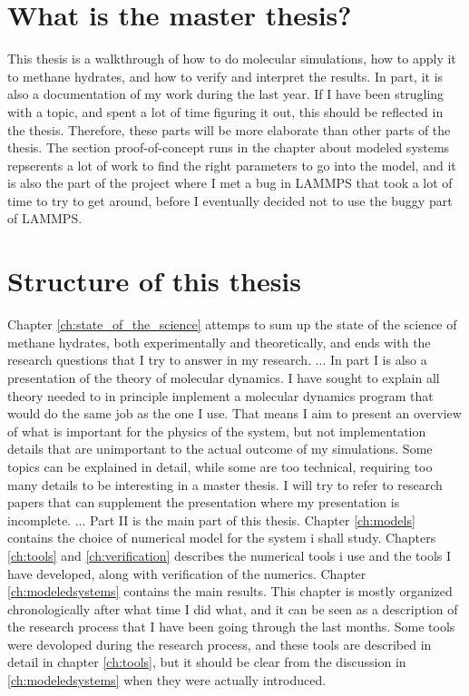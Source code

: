 \section{What is the master thesis?}
This thesis is a walkthrough of how to do molecular simulations, how to apply it to methane hydrates, and how to verify and interpret the results. In part, it is also a documentation of my work during the last year. If I have been strugling with a topic, and spent a lot of time figuring it out, this should be reflected in the thesis. Therefore, these parts will be more elaborate than other parts of the thesis. The section proof-of-concept runs in the chapter about modeled systems repserents a lot of work to find the right parameters to go into the model, and it is also the part of the project where I met a bug in LAMMPS that took a lot of time to try to get around, before I eventually decided not to use the buggy part of LAMMPS.


\section{Structure of this thesis}

Chapter \ref{ch:state_of_the_science} attemps to sum up the state of the science of methane hydrates, both experimentally and theoretically, and ends with the research questions that I try to answer in my research.
...
In part I is also a presentation of the theory of molecular dynamics. I have sought to explain all theory needed to in principle implement a molecular dynamics program that would do the same job as the one I use. That means I aim to present an overview of what is important for the physics of the system, but not implementation details that are unimportant to the actual outcome of my simulations. Some topics can be explained in detail, while some are too technical, requiring too many details to be interesting in a master thesis. I will try to refer to research papers that can supplement the presentation where my presentation is incomplete.
...
Part II is the main part of this thesis. Chapter \ref{ch:models} contains the choice of numerical model for the system i shall study. Chapters \ref{ch:tools} and \ref{ch:verification} describes the numerical tools i use and the tools I have developed, along with verification of the numerics. Chapter \ref{ch:modeledsystems} contains the main results. This chapter is mostly organized chronologically after what time I did what, and it can be seen as a description of the research process that I have been going through the last months. Some tools were devoloped during the research process, and these tools are described in detail in chapter \ref{ch:tools}, but it should be clear from the discussion in \ref{ch:modeledsystems} when they were actually introduced.


